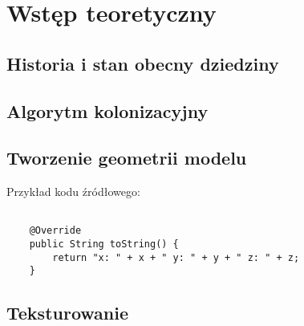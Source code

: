 \chapter{Wstęp teoretyczny}



\section{Historia i stan obecny dziedziny}

\section{Algorytm kolonizacyjny}

\section{Tworzenie geometrii modelu}

Przykład kodu źródłowego:

\begin{verbatim}
    
    @Override
    public String toString() {
        return "x: " + x + " y: " + y + " z: " + z;
    }

\end{verbatim}

\section{Teksturowanie}